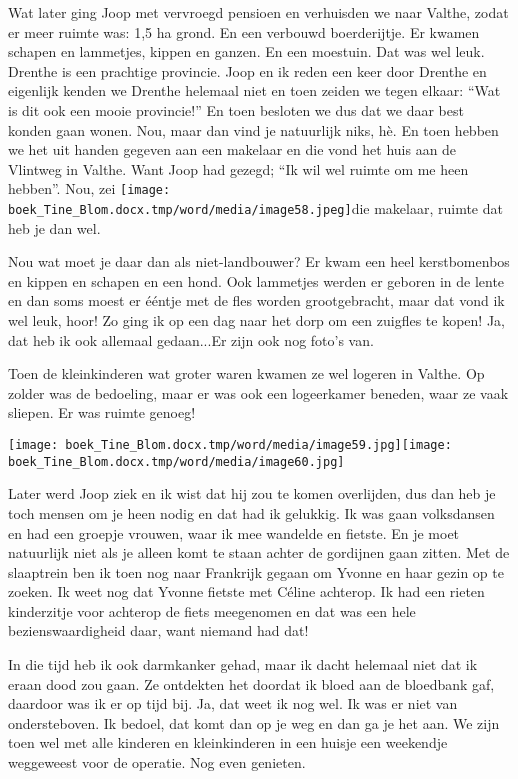 \documentclass{scrbook}
\begin{document}
{Wat later ging Joop met vervroegd pensioen en verhuisden we naar Valthe, zodat er meer ruimte was: 1,5 ha grond. En een verbouwd boerderijtje. Er kwamen schapen en lammetjes, kippen en ganzen. En een moestuin. Dat was wel leuk. Drenthe is een prachtige provincie. Joop en ik reden een keer door Drenthe en eigenlijk kenden we Drenthe helemaal niet en toen zeiden we tegen elkaar: ``Wat is dit ook een mooie provincie!'' En toen besloten we dus dat we daar best konden gaan wonen. Nou, maar dan vind je natuurlijk niks, h\`{e}. En toen hebben we het uit handen gegeven aan een makelaar en die vond het huis aan de Vlintweg in Valthe. Want Joop had gezegd; ``Ik wil wel ruimte om me heen hebben''. Nou, zei \texttt{[image: boek\_Tine\_Blom.docx.tmp/word/media/image58.jpeg]}die makelaar, ruimte dat heb je dan wel.

Nou wat moet je daar dan als niet-landbouwer? Er kwam een heel kerstbomenbos en kippen en schapen en een hond. Ook lammetjes werden er geboren in de lente en dan soms moest er \'{e}\'{e}ntje met de fles worden grootgebracht, maar dat vond ik wel leuk, hoor! Zo ging ik op een dag naar het dorp om een zuigfles te kopen! Ja, dat heb ik ook allemaal gedaan...Er zijn ook nog foto’s van. 

 

Toen de kleinkinderen wat groter waren kwamen ze wel logeren in Valthe. Op zolder was de bedoeling, maar er was ook een logeerkamer beneden, waar ze vaak sliepen. Er was ruimte genoeg!

\texttt{[image: boek\_Tine\_Blom.docx.tmp/word/media/image59.jpg]}\texttt{[image: boek\_Tine\_Blom.docx.tmp/word/media/image60.jpg]}

Later werd Joop ziek en ik wist dat hij zou te komen overlijden, dus dan heb je toch mensen om je heen nodig en dat had ik gelukkig. Ik was gaan volksdansen en had een groepje vrouwen, waar ik mee wandelde en fietste. En je moet natuurlijk niet als je alleen komt te staan achter de gordijnen gaan zitten. Met de slaaptrein ben ik toen nog naar Frankrijk gegaan om Yvonne en haar gezin op te zoeken. Ik weet nog dat Yvonne fietste met C\'{e}line achterop. Ik had een rieten kinderzitje voor achterop de fiets meegenomen en dat was een hele bezienswaardigheid daar, want niemand had dat!

In die tijd heb ik ook darmkanker gehad, maar ik dacht helemaal niet dat ik eraan dood zou gaan. Ze ontdekten het doordat ik bloed aan de bloedbank gaf, daardoor was ik er op tijd bij. Ja, dat weet ik nog wel. Ik was er niet van ondersteboven. Ik bedoel, dat komt dan op je weg en dan ga je het aan. We zijn toen wel met alle kinderen en kleinkinderen in een huisje een weekendje weggeweest voor de operatie. Nog even genieten.

}
\end{document}
